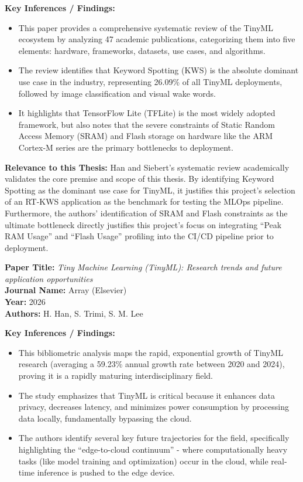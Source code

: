 \documentclass[11pt,a4paper,openany]{book}
\begin{document}
\vspace{0.5em}
\noindent\textbf{Key Inferences / Findings:}
\begin{itemize}
    \item This paper provides a comprehensive systematic review of the TinyML ecosystem by analyzing 47 academic publications, categorizing them into five elements: hardware, frameworks, datasets, use cases, and algorithms.
    \item The review identifies that Keyword Spotting (KWS) is the absolute dominant use case in the industry, representing 26.09\% of all TinyML deployments, followed by image classification and visual wake words.
    \item It highlights that TensorFlow Lite (TFLite) is the most widely adopted framework, but also notes that the severe constraints of Static Random Access Memory (SRAM) and Flash storage on hardware like the ARM Cortex-M series are the primary bottlenecks to deployment.
\end{itemize}

\vspace{0.5em}
\noindent\textbf{Relevance to this Thesis:} Han and Siebert's systematic review academically validates the core premise and scope of this thesis. By identifying Keyword Spotting as the dominant use case for TinyML, it justifies this project's selection of an RT-KWS application as the benchmark for testing the MLOps pipeline. Furthermore, the authors' identification of SRAM and Flash constraints as the ultimate bottleneck directly justifies this project's focus on integrating ``Peak RAM Usage'' and ``Flash Usage'' profiling into the CI/CD pipeline prior to deployment.

\vspace{2em}
\noindent\textbf{Paper Title:} \textit{Tiny Machine Learning (TinyML): Research trends and future application opportunities} \cite{13}\\
\textbf{Journal Name:} Array (Elsevier)\\
\textbf{Year:} 2026\\
\textbf{Authors:} H. Han, S. Trimi, S. M. Lee

\vspace{0.5em}
\noindent\textbf{Key Inferences / Findings:}
\begin{itemize}
    \item This bibliometric analysis maps the rapid, exponential growth of TinyML research (averaging a 59.23\% annual growth rate between 2020 and 2024), proving it is a rapidly maturing interdisciplinary field.
    \item The study emphasizes that TinyML is critical because it enhances data privacy, decreases latency, and minimizes power consumption by processing data locally, fundamentally bypassing the cloud.
    \item The authors identify several key future trajectories for the field, specifically highlighting the ``edge-to-cloud continuum'' - where computationally heavy tasks (like model training and optimization) occur in the cloud, while real-time inference is pushed to the edge device.
\end{itemize}
\end{document}
